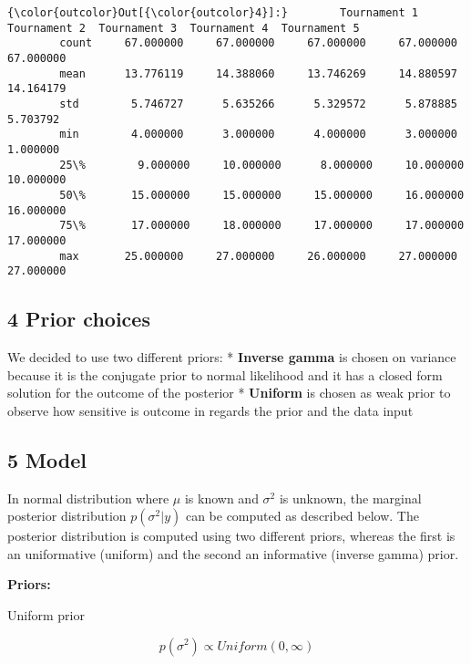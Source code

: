 \documentclass[11pt]{article}
\begin{document}
\begin{Verbatim}[commandchars=\\\{\}]
{\color{outcolor}Out[{\color{outcolor}4}]:}        Tournament 1  Tournament 2  Tournament 3  Tournament 4  Tournament 5
        count     67.000000     67.000000     67.000000     67.000000     67.000000
        mean      13.776119     14.388060     13.746269     14.880597     14.164179
        std        5.746727      5.635266      5.329572      5.878885      5.703792
        min        4.000000      3.000000      4.000000      3.000000      1.000000
        25\%        9.000000     10.000000      8.000000     10.000000     10.000000
        50\%       15.000000     15.000000     15.000000     16.000000     16.000000
        75\%       17.000000     18.000000     17.000000     17.000000     17.000000
        max       25.000000     27.000000     26.000000     27.000000     27.000000
\end{Verbatim}
            
    \hypertarget{prior-choices}{%
\subsection{4 Prior choices}\label{prior-choices}}

We decided to use two different priors: * \textbf{Inverse gamma} is
chosen on variance because it is the conjugate prior to normal
likelihood and it has a closed form solution for the outcome of the
posterior * \textbf{Uniform} is chosen as weak prior to observe how
sensitive is outcome in regards the prior and the data input

    \hypertarget{model}{%
\subsection{5 Model}\label{model}}

In normal distribution where \(\mu\) is known and \(\sigma^2\) is
unknown, the marginal posterior distribution \(p(\sigma^2|y)\) can be
computed as described below. The posterior distribution is computed
using two different priors, whereas the first is an uniformative
(uniform) and the second an informative (inverse gamma) prior.

\textbf{Priors:}

Uniform prior

\begin{equation*}
p(\sigma^2) \propto Uniform(0, \infty)
\end{equation*}
\end{document}
